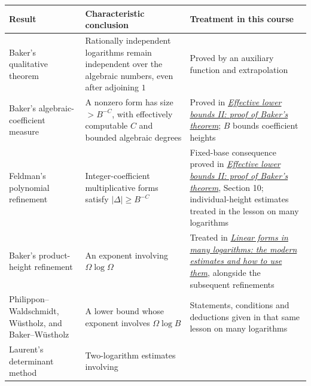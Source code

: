 \documentclass[
  11pt,
  a4paper,
]{article}
\newcounter{none} %
\begin{document}
{\def\LTcaptype{none} %
\begin{longtable}[]{@{}
  >{\raggedright\arraybackslash}p{}
  >{\raggedright\arraybackslash}p{}
  >{\raggedright\arraybackslash}p{}@{}}
\toprule\noalign{}
\begin{minipage}[b]{\linewidth}\raggedright
Result
\end{minipage} & \begin{minipage}[b]{\linewidth}\raggedright
Characteristic conclusion
\end{minipage} & \begin{minipage}[b]{\linewidth}\raggedright
Treatment in this course
\end{minipage} \\
\midrule\noalign{}
\endhead
\bottomrule\noalign{}
\endlastfoot
Baker's qualitative theorem & Rationally independent logarithms remain
independent over the algebraic numbers, even after adjoining \(1\) &
Proved by an auxiliary function and extrapolation \\
Baker's algebraic-coefficient measure & A nonzero form has size
\(>B^{-C}\), with effectively computable \(C\) and bounded algebraic
degrees & Proved in \href{https://kokunoyumeto.github.io/open-math-courses-public/courses/TR-BAKER/TR-BAKER-05.html}{\emph{Effective lower
bounds II: proof of Baker's theorem}}; \(B\) bounds coefficient
heights \\
Feldman's polynomial refinement & Integer-coefficient multiplicative
forms satisfy \(\lvert\Delta\rvert\ge B^{-C}\) & Fixed-base consequence
proved in \href{https://kokunoyumeto.github.io/open-math-courses-public/courses/TR-BAKER/TR-BAKER-05.html}{\emph{Effective lower bounds II:
proof of Baker's theorem}}, Section 10; individual-height estimates
treated in the lesson on many logarithms \\
Baker's product-height refinement & An exponent involving
\(\Omega\log\Omega\) & Treated in
\href{https://kokunoyumeto.github.io/open-math-courses-public/courses/TR-BAKER/TR-BAKER-08.html}{\emph{Linear forms in many logarithms: the
modern estimates and how to use them}}, alongside the subsequent
refinements \\
Philippon--Waldschmidt, Wüstholz, and Baker--Wüstholz & A lower bound
whose exponent involves \(\Omega\log B\) & Statements, conditions and
deductions given in that same lesson on many logarithms \\
Laurent's determinant method & Two-logarithm estimates involving

\end{longtable}}
\end{document}
